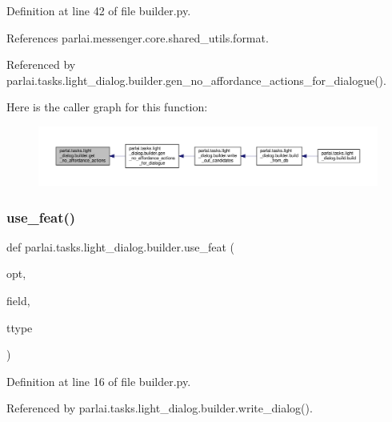 Definition at line 42 of file builder.\+py.



References parlai.\+messenger.\+core.\+shared\+\_\+utils.\+format.



Referenced by parlai.\+tasks.\+light\+\_\+dialog.\+builder.\+gen\+\_\+no\+\_\+affordance\+\_\+actions\+\_\+for\+\_\+dialogue().

Here is the caller graph for this function\+:
\nopagebreak
\begin{figure}[H]
\begin{center}
\leavevmode
\includegraphics[width=350pt]{namespaceparlai_1_1tasks_1_1light__dialog_1_1builder_a51921236462b49d240bfde4a648c3ec3_icgraph}
\end{center}
\end{figure}
\mbox{\label{namespaceparlai_1_1tasks_1_1light__dialog_1_1builder_ad9de2827ebcf8386662e48c7fe011e43}} 
\subsubsection{\texorpdfstring{use\+\_\+feat()}{use\_feat()}}
{\footnotesize\ttfamily def parlai.\+tasks.\+light\+\_\+dialog.\+builder.\+use\+\_\+feat (\begin{DoxyParamCaption}\item[{}]{opt,  }\item[{}]{field,  }\item[{}]{ttype }\end{DoxyParamCaption})}



Definition at line 16 of file builder.\+py.



Referenced by parlai.\+tasks.\+light\+\_\+dialog.\+builder.\+write\+\_\+dialog().

